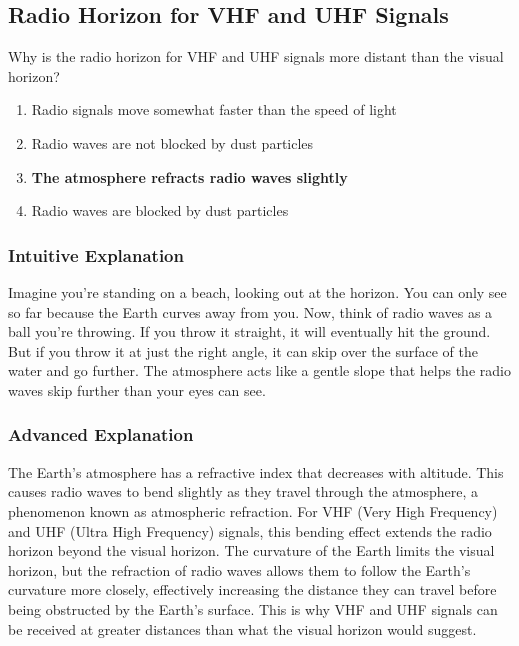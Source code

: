 \subsection{Radio Horizon for VHF and UHF Signals}
\label{T3C11}

\begin{tcolorbox}[colback=gray!10!white,colframe=black!75!black,title=T3C11]
Why is the radio horizon for VHF and UHF signals more distant than the visual horizon?
\begin{enumerate}[noitemsep]
    \item Radio signals move somewhat faster than the speed of light
    \item Radio waves are not blocked by dust particles
    \item \textbf{The atmosphere refracts radio waves slightly}
    \item Radio waves are blocked by dust particles
\end{enumerate}
\end{tcolorbox}

\subsubsection*{Intuitive Explanation}
Imagine you're standing on a beach, looking out at the horizon. You can only see so far because the Earth curves away from you. Now, think of radio waves as a ball you're throwing. If you throw it straight, it will eventually hit the ground. But if you throw it at just the right angle, it can skip over the surface of the water and go further. The atmosphere acts like a gentle slope that helps the radio waves skip further than your eyes can see.

\subsubsection*{Advanced Explanation}
The Earth's atmosphere has a refractive index that decreases with altitude. This causes radio waves to bend slightly as they travel through the atmosphere, a phenomenon known as atmospheric refraction. For VHF (Very High Frequency) and UHF (Ultra High Frequency) signals, this bending effect extends the radio horizon beyond the visual horizon. The curvature of the Earth limits the visual horizon, but the refraction of radio waves allows them to follow the Earth's curvature more closely, effectively increasing the distance they can travel before being obstructed by the Earth's surface. This is why VHF and UHF signals can be received at greater distances than what the visual horizon would suggest.